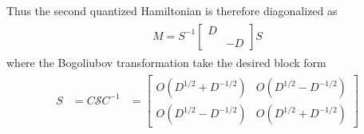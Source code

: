 Thus the second quantized Hamiltonian is therefore diagonalized as
\begin{eqnarray}\begin{aligned}
M=S^{-1}
\begin{bmatrix}
D \\
& -D
\end{bmatrix}
S
\end{aligned}\end{eqnarray}
where the Bogoliubov transformation take the desired block form
\begin{eqnarray}\begin{aligned}
S&=C\mathcal{S}C^{-1}
&=\begin{bmatrix}
O(D^{1/2}+D^{-1/2}) & O(D^{1/2}-D^{-1/2}) \\
O(D^{1/2}-D^{-1/2}) & O(D^{1/2}+D^{-1/2}) 
\end{bmatrix}
\end{aligned}\end{eqnarray}


